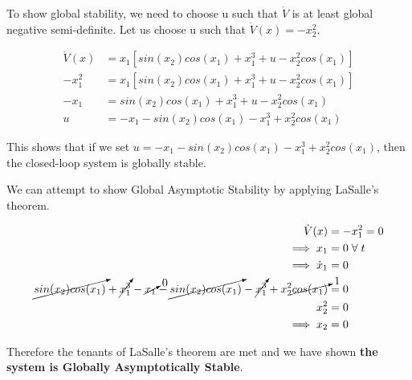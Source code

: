 \documentclass{article}
\begin{document}
  To show global stability, we need to choose u such that $\dot{V}$ is at least
  global negative semi-definite. Let us choose u such that $\dot{V}(x) =
  -x_2^2$.

  \begin{align*}
    \dot{V}(x) &= x_1[sin(x_2)cos(x_1) + x_1^3 + u - x_2^2cos(x_1)] \\
    -x_1^2 &= x_1[sin(x_2)cos(x_1) + x_1^3 + u - x_2^2cos(x_1)] \\
    -x_1 &= sin(x_2)cos(x_1) + x_1^3 + u - x_2^2cos(x_1) \\
    u &= -x_1 - sin(x_2)cos(x_1) - x_1^3 + x_2^2cos(x_1)
  \end{align*}

  This shows that if we set $u=-x_1 - sin(x_2)cos(x_1) - x_1^3 + x_2^2cos(x_1)$, then the closed-loop system is
  globally stable. 
   
  We can attempt to show Global Asymptotic Stability by applying LaSalle's theorem.
 
  \begin{align*}
    \dot{V}(x) &= -x_1^2 = 0 \\
    \implies x_1 &= 0 \hspace{1mm} \forall \hspace{1mm} t \\
    \implies \dot{x}_1 &= 0 \\
    \cancelto{}{sin(x_2)cos(x_1)} + \cancelto{}{x_1^3} - \cancelto{0}{x_1} - \cancelto{}{sin(x_2)cos(x_1)} - \cancelto{}{x_1^3} + x_2^2\cancelto{1}{cos(x_1)} &= 0 \\
    x_2^2 &= 0 \\
    \implies x_2 &= 0
  \end{align*}

  Therefore the tenants of LaSalle's theorem are met and we have shown
  \textbf{the system is Globally Asymptotically Stable}. 
\end{document}
